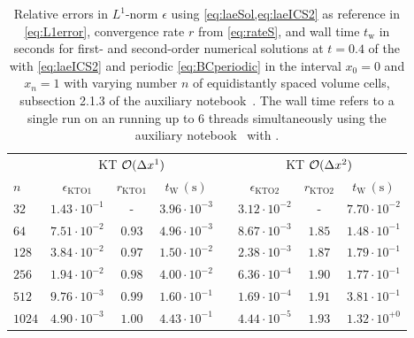 \begin{table}[t]
	\centering
	\caption{\label{tab:lae_P2convergence}
		Relative errors in $L^1$-norm $\epsilon$ using \cref{eq:laeSol,eq:laeICS2} as reference in \cref{eq:L1error}, convergence rate $r$ from \cref{eq:rateS}, and wall time $t_\mathrm{w}$ in seconds for first- and second-order \ktScheme{} numerical solutions at $t=0.4$ of the \laeq{} with \ic{} \nolinebreak[3]\eqref{eq:laeICS2} and periodic \bc{} \eqref{eq:BCperiodic} in the interval $x_0=0$ and $x_{n}=1$ with varying number $n$ of equidistantly spaced volume cells, \cf{} subsection 2.1.3 of the auxiliary notebook~\cite{Steil:2023PhDFVNB}.
		The wall time refers to a single run on an \intel{} running up to 6 threads simultaneously using the auxiliary notebook~\cite{Steil:2023PhDFVNB} with \WAMvwR{}.
	}
	\vspace{\TableAbovecaptionskip}
	\renewcommand{\arraystretch}{1.15}
	\small
	\begin{tabular}{l c c c p{0.2em} c c c}
		\toprule
		&	\multicolumn{3}{c}{KT $\mathcal{O}(\Delta x^1)$}&														&	\multicolumn{3}{c}{KT $\mathcal{O}(\Delta x^2)$}
		\\\cmidrule(lr){2-4}																	\cmidrule(lr){6-8}
		$n$		&	$\epsilon_\mathrm{KTO1}$	&	$r_\mathrm{KTO1}$	&	$t_\mathrm{W}\,(\mathrm{s})$&	&	$\epsilon_\mathrm{KTO2}$	&	$r_\mathrm{KTO2}$	&	$t_\mathrm{W}\,(\mathrm{s})$
		\\
		\midrule\addlinespace[0.25em]
			$32$	&	$1.43\cdot 10^{-1}$	&	-	&	$3.96\cdot 10^{-3}$	&		&	$3.12\cdot 10^{-2}$	&	-	&	$7.70\cdot 10^{-2}$\\
			$64$	&	$7.51\cdot 10^{-2}$	&	$0.93$	&	$4.96\cdot 10^{-3}$	&		&	$8.67\cdot 10^{-3}$	&	$1.85$	&	$1.48\cdot 10^{-1}$\\
			$128$	&	$3.84\cdot 10^{-2}$	&	$0.97$	&	$1.50\cdot 10^{-2}$	&		&	$2.38\cdot 10^{-3}$	&	$1.87$	&	$1.79\cdot 10^{-1}$\\
			$256$	&	$1.94\cdot 10^{-2}$	&	$0.98$	&	$4.00\cdot 10^{-2}$	&		&	$6.36\cdot 10^{-4}$	&	$1.90$	&	$1.77\cdot 10^{-1}$\\
			$512$	&	$9.76\cdot 10^{-3}$	&	$0.99$	&	$1.60\cdot 10^{-1}$	&		&	$1.69\cdot 10^{-4}$	&	$1.91$	&	$3.81\cdot 10^{-1}$\\
			$1024$	&	$4.90\cdot 10^{-3}$	&	$1.00$	&	$4.43\cdot 10^{-1}$	&		&	$4.44\cdot 10^{-5}$	&	$1.93$	&	$1.32\cdot 10^{+0}$\\
		\bottomrule
	\end{tabular}
\end{table}
		
